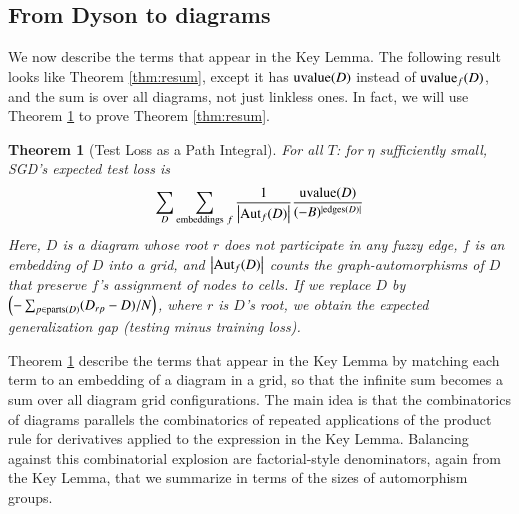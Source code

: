 \documentclass[anon,12pt]{colt2021} %
\newtheorem{thm}{Theorem}
\newcommand{\wrap}[1]{\left(#1\right)}
\newcommand{\wabs}[1]{\left|#1\right|}
\newcommand{\Aut}{\text{\textnormal{Aut}}}
\newcommand{\uvalue}{\text{\textnormal{uvalue}}}
\newcommand{\edges}{\text{\textnormal{edges}}}
\newcommand{\parts}{\text{\textnormal{parts}}}
\begin{document}
    \subsection{From Dyson to diagrams}                             \label{appendix:toward-diagrams}


        We now describe the terms that appear in the Key Lemma.  The following
        result looks like Theorem \ref{thm:resum}, except it has $\uvalue(D)$
        instead of $\uvalue_f(D)$, and the sum is over all diagrams, not just
        linkless ones.  In fact, we will use Theorem \ref{thm:pathint} to
        prove Theorem \ref{thm:resum}.

        \begin{thm}[Test Loss as a Path Integral] \label{thm:pathint}
            For all $T$: for $\eta$ sufficiently small, SGD's expected test
            loss is
            \begin{equation*}\label{eq:sgdcoef}
                \sum_{D}
                    \sum_{\text{embeddings}~f}
                    \frac{1}{\wabs{\Aut_f(D)}}
                \frac{\uvalue(D)}{(-B)^{|\edges(D)|}}
            \end{equation*}
            Here, $D$ is a diagram whose root $r$ does not participate in
            any fuzzy edge, $f$ is an embedding of $D$ into a grid, and
            $\wabs{\Aut_f(D)}$ counts the graph-automorphisms of $D$ that
            preserve $f$'s assignment of nodes to cells.
            If we replace $D$ by 
            $
                \wrap{-\sum_{p \in \parts(D)} (D_{rp} - D)/N}
            $, where $r$ is $D$'s root,
            we obtain the expected generalization gap (testing minus training loss).
        \end{thm}

        Theorem \ref{thm:pathint} describe the terms that appear in the Key
        Lemma by matching each term to an embedding of a diagram in a grid,
        so that the infinite sum becomes a sum over all diagram grid 
        configurations.  The main idea is that the combinatorics of diagrams
        parallels the combinatorics of repeated applications of the product
        rule for derivatives applied to the expression in the Key Lemma.
        Balancing against this combinatorial explosion are factorial-style
        denominators, again from the Key Lemma, that we summarize in terms of
        the sizes of automorphism groups.
\end{document}
